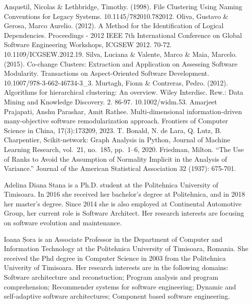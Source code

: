 \documentclass{ieeeaccess}
\begin{document}
\begin{thebibliography}{00}
 Anquetil, Nicolas \& Lethbridge, Timothy. (1998). File Clustering Using Naming Conventions for Legacy Systems. 10.1145/782010.782012. 
 Oliva, Gustavo \& Gerosa, Marco Aurelio. (2012). A Method for the Identification of Logical Dependencies. Proceedings - 2012 IEEE 7th International Conference on Global Software Engineering Workshops, ICGSEW 2012. 70-72. 10.1109/ICGSEW.2012.19. 
 Silva, Luciana \& Valente, Marco \& Maia, Marcelo. (2015). Co-change Clusters: Extraction and Application on Assessing Software Modularity. Transactions on Aspect-Oriented Software Development. 10.1007/978-3-662-46734-3\_3. 
 Murtagh, Fionn \& Contreras, Pedro. (2012). Algorithms for hierarchical clustering: An overview. Wiley Interdisc. Rew.: Data Mining and Knowledge Discovery. 2. 86-97. 10.1002/widm.53. 
 Amarjeet Prajapati, Anshu Parashar, Amit Rathee. Multi-dimensional information-driven many-objective software remodularization approach. Frontiers of Computer Science in China, 17(3):173209, 2023.
 T. Bonald, N. de Lara, Q. Lutz, B. Charpentier, Scikit-network: Graph Analysis in Python, Journal of Machine Learning Research, vol.~21, no.~185, pp.~1--6, 2020. 
 Friedman, Milton. “The Use of Ranks to Avoid the Assumption of Normality Implicit in the Analysis of Variance.” Journal of the American Statistical Association 32 (1937): 675-701.


\end{thebibliography}


\newpage

\begin{IEEEbiographynophoto}{Adelina Diana Stana} is a Ph.D. student at the Politehnica University of Timisoara.
In 2016 she received her bachelor’s degree at Politehnica, and in 2018 her master’s degree. Since 2014 she is also employed at Continental Automotive Group, her current role is Software Architect. Her research interests are focusing on software evolution and maintenance.
\end{IEEEbiographynophoto}

\begin{IEEEbiographynophoto}{Ioana Șora} is an Associate Professor in the Department of Computer and Information Technology at the Politehnica University of Timisoara, Romania. She received the Phd degree in Computer Science in 2003 from the Politehnica Univerity of Timisoara.
Her research interests are in the following domains: Software architecture and reconstuction; Program analysis and program comprehension; Recommender systems for software engineering; Dynamic and self-adaptive software architectures; Component based software engineering.
\end{IEEEbiographynophoto}

\EOD
\end{document}
